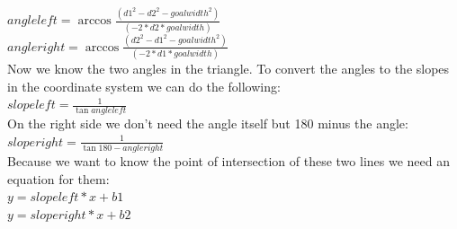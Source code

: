 \documentclass[lnicst,a4paper]{svmultln}
\begin{document}
\(angleleft = \arccos{\frac{(d1^2 - d2^2 - goalwidth^2)}{(-2*d2*goalwidth)}}\)\\
\(angleright = \arccos{\frac{(d2^2 - d1^2 - goalwidth^2)}{(-2*d1*goalwidth)}}\)\\
Now we know the two angles in the triangle. To convert the angles to the slopes in the coordinate system we can do the following:\\
\(slopeleft = \frac{1}{\tan{angleleft}}\)\\
On the right side we don't need the angle itself but 180 minus the angle:
\(sloperight = \frac{1}{\tan{180 - angleright}}\)\\
Because we want to know the point of intersection of these two lines we need an equation for them:\\
\(y = slopeleft * x + b1\)\\
\(y = sloperight * x + b2\)\\




\end{document}
